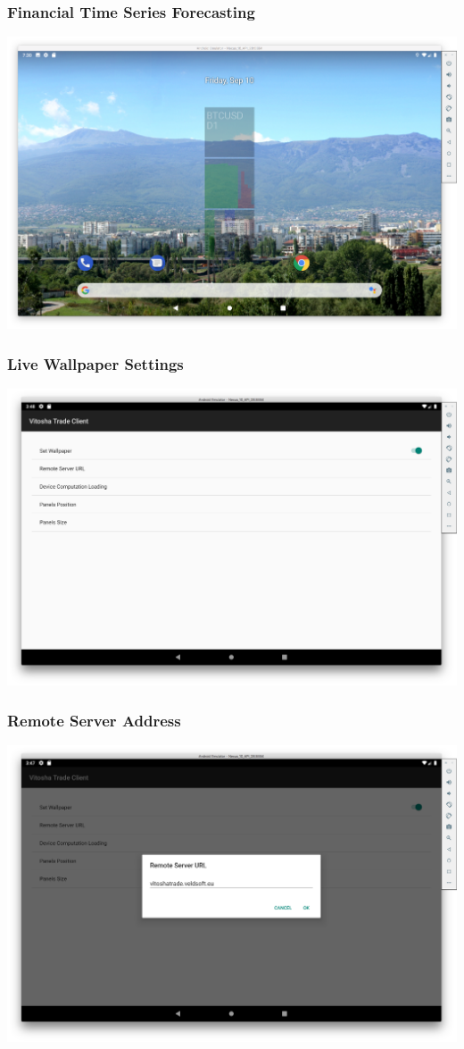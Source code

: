 \documentclass{beamer}
\begin{document}
\begin{frame}
\frametitle{Financial Time Series Forecasting}
\includegraphics[scale=0.15]{fig01}
\end{frame}

\begin{frame}
\frametitle{Live Wallpaper Settings}
\includegraphics[scale=0.15]{fig02}
\end{frame}

\begin{frame}
\frametitle{Remote Server Address}
\includegraphics[scale=0.15]{fig03}
\end{frame}
\end{document}

